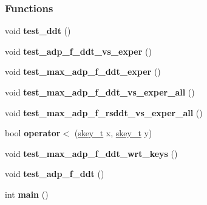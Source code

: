 \subsubsection*{\-Functions}
\begin{DoxyCompactItemize}
\item 
\hypertarget{adp-tea-f-fk-ddt-tests_8cc_a23e0c9402a1f01981ae8bd371dd8b5cb}{void {\bfseries test\-\_\-ddt} ()}\label{adp-tea-f-fk-ddt-tests_8cc_a23e0c9402a1f01981ae8bd371dd8b5cb}

\item 
\hypertarget{adp-tea-f-fk-ddt-tests_8cc_a24f21d65dab6eb7bf2dbda7168c9a812}{void {\bfseries test\-\_\-adp\-\_\-f\-\_\-ddt\-\_\-vs\-\_\-exper} ()}\label{adp-tea-f-fk-ddt-tests_8cc_a24f21d65dab6eb7bf2dbda7168c9a812}

\item 
\hypertarget{adp-tea-f-fk-ddt-tests_8cc_a93d3fc6c9df2b20151dde8d984e65715}{void {\bfseries test\-\_\-max\-\_\-adp\-\_\-f\-\_\-ddt\-\_\-exper} ()}\label{adp-tea-f-fk-ddt-tests_8cc_a93d3fc6c9df2b20151dde8d984e65715}

\item 
\hypertarget{adp-tea-f-fk-ddt-tests_8cc_a605fbcfac1832f0c1669cf02a3055ede}{void {\bfseries test\-\_\-max\-\_\-adp\-\_\-f\-\_\-ddt\-\_\-vs\-\_\-exper\-\_\-all} ()}\label{adp-tea-f-fk-ddt-tests_8cc_a605fbcfac1832f0c1669cf02a3055ede}

\item 
\hypertarget{adp-tea-f-fk-ddt-tests_8cc_ab42a188c0bfb708fb97fee483b630b42}{void {\bfseries test\-\_\-max\-\_\-adp\-\_\-f\-\_\-rsddt\-\_\-vs\-\_\-exper\-\_\-all} ()}\label{adp-tea-f-fk-ddt-tests_8cc_ab42a188c0bfb708fb97fee483b630b42}

\item 
\hypertarget{adp-tea-f-fk-ddt-tests_8cc_a2cc7546dc1c4ffb5afb79bd2da4ebee6}{bool {\bfseries operator$<$} (\hyperlink{structskey__t}{skey\-\_\-t} x, \hyperlink{structskey__t}{skey\-\_\-t} y)}\label{adp-tea-f-fk-ddt-tests_8cc_a2cc7546dc1c4ffb5afb79bd2da4ebee6}

\item 
\hypertarget{adp-tea-f-fk-ddt-tests_8cc_a4ffa119db79f364e6064f11f97283cda}{void {\bfseries test\-\_\-max\-\_\-adp\-\_\-f\-\_\-ddt\-\_\-wrt\-\_\-keys} ()}\label{adp-tea-f-fk-ddt-tests_8cc_a4ffa119db79f364e6064f11f97283cda}

\item 
\hypertarget{adp-tea-f-fk-ddt-tests_8cc_ab7bac8c9f25651bc12609564b28610dd}{void {\bfseries test\-\_\-adp\-\_\-f\-\_\-ddt} ()}\label{adp-tea-f-fk-ddt-tests_8cc_ab7bac8c9f25651bc12609564b28610dd}

\item 
\hypertarget{adp-tea-f-fk-ddt-tests_8cc_ae66f6b31b5ad750f1fe042a706a4e3d4}{int {\bfseries main} ()}\label{adp-tea-f-fk-ddt-tests_8cc_ae66f6b31b5ad750f1fe042a706a4e3d4}

\end{DoxyCompactItemize}


